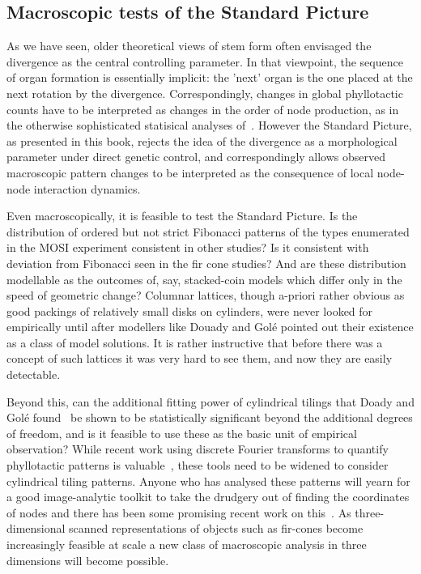  
\subsection{Macroscopic tests of the Standard Picture}
As we have seen, older theoretical views of stem form often envisaged the divergence as the central controlling parameter. In that viewpoint, the sequence of organ formation is essentially implicit: the 'next' organ is the one placed at the next rotation by the divergence. Correspondingly, changes in global phyllotactic counts have to be interpreted as changes in the order of node production, as in the otherwise  sophisticated statisical analyses of~\cite{guedonPatternIdentificationCharacterization2013}. However the Standard Picture, as presented in this book, rejects the idea of the divergence as a morphological parameter under direct genetic control, and correspondingly allows observed macroscopic pattern changes to be interpreted as the consequence of local node-node interaction dynamics. 


Even macroscopically, it is feasible to test the Standard Picture. Is the distribution of ordered but not strict Fibonacci patterns of the types enumerated in the MOSI experiment consistent in other studies? Is it consistent with deviation from Fibonacci seen in the fir cone studies? And are these distribution modellable as the outcomes of, say, stacked-coin models which differ only in the speed of geometric change? 
Columnar lattices, though a-priori rather obvious as good packings of relatively small disks on cylinders, were never looked for empirically until after modellers like Douady and Golé pointed out their existence as a class of model solutions. It is rather instructive that before there was a concept of such lattices it was very hard to see them, and now they are easily detectable. 


Beyond this, can the additional fitting power of cylindrical tilings that Doady and Golé found~\cite{douadyFibonacciQuasisymmetricPhyllotaxis2016} be shown to be statistically significant beyond the additional degrees of freedom, and is it feasible to use these as the basic unit of empirical observation? While recent work using discrete Fourier transforms to quantify phyllotactic patterns is valuable~\cite{negishiDeterminingParastichyPairs2022}, these tools need to be widened to consider cylindrical tiling patterns. Anyone who has analysed these patterns will yearn for a good image-analytic toolkit to take the drudgery out of finding the coordinates of nodes and there has been some promising recent work on this~\cite{aliyevMathematicalModelPlacement2023,aliyevStudyDistributionPhenotypic2024}.  As three-dimensional scanned representations of objects such as fir-cones become increasingly feasible at scale a new class of macroscopic analysis in three dimensions will become possible. 
 

